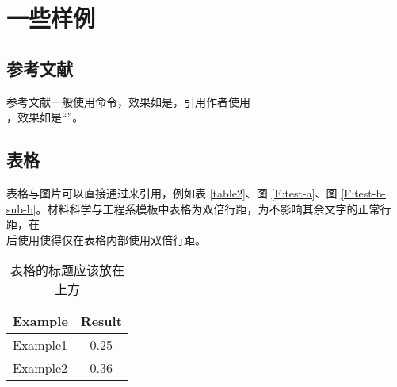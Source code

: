 
\section{一些样例}

\subsection{参考文献}

参考文献一般使用命令，效果如是\cite{Nicholas1998Handbook}，引用作者使用 \\ ，效果如是“\citeauthor{goossens1994latex}”。

\subsection{表格}

表格与图片可以直接通过\verbbox{\ref{<key>}}来引用，例如表 \ref{table2}、图 \ref{F:test-a}、图 \ref{F:test-b-sub-b}。材料科学与工程系模板中表格为双倍行距，为不影响其余文字的正常行距，在 \\ \verbbox{\begin{table}}后使用\verbbox{\renewcommand{\arraystretch}{1.5}}使得仅在表格内部使用双倍行距。

\begin{table}[htb]
    \renewcommand{\arraystretch}{1.5} %
    \centering
    \caption{表格的标题应该放在上方}
    \label{table}
    \begin{tabular}{lc} %
        \toprule
        Example & Result \\
        \midrule
        Example1          & 0.25 \\
        Example2          & 0.36 \\
        \bottomrule
    \end{tabular}
\end{table}


